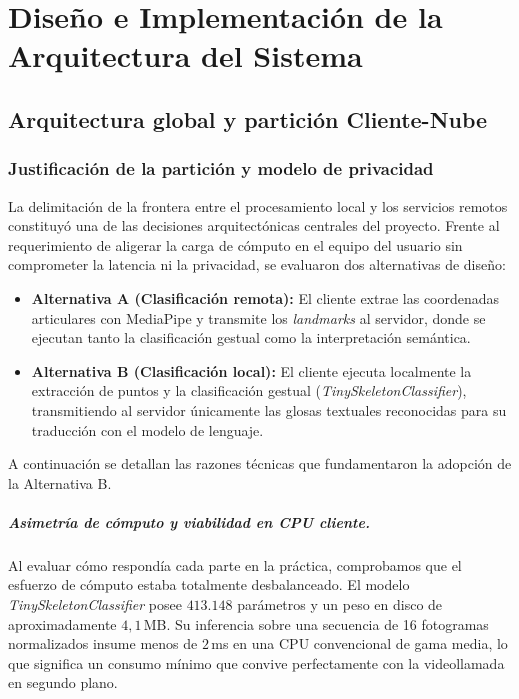 \chapter{Diseño e Implementación de la Arquitectura del Sistema}

\section{Arquitectura global y partición Cliente-Nube}
\subsection{Justificación de la partición y modelo de privacidad}

La delimitación de la frontera entre el procesamiento local y los servicios remotos constituyó una de las decisiones arquitectónicas centrales del proyecto. Frente al requerimiento de aligerar la carga de cómputo en el equipo del usuario sin comprometer la latencia ni la privacidad, se evaluaron dos alternativas de diseño:
\begin{itemize}
    \item \textbf{Alternativa A (Clasificación remota):} El cliente extrae las coordenadas articulares con MediaPipe y transmite los \textit{landmarks} al servidor, donde se ejecutan tanto la clasificación gestual como la interpretación semántica.
    \item \textbf{Alternativa B (Clasificación local):} El cliente ejecuta localmente la extracción de puntos y la clasificación gestual (\textit{TinySkeletonClassifier}), transmitiendo al servidor únicamente las glosas textuales reconocidas para su traducción con el modelo de lenguaje.
\end{itemize}

A continuación se detallan las razones técnicas que fundamentaron la adopción de la Alternativa B.

\paragraph{Asimetría de cómputo y viabilidad en CPU cliente.}
Al evaluar cómo respondía cada parte en la práctica, comprobamos que el esfuerzo de cómputo estaba totalmente desbalanceado. El modelo \textit{TinySkeletonClassifier} posee $413.148$ parámetros y un peso en disco de aproximadamente $4{,}1$\,MB. Su inferencia sobre una secuencia de 16 fotogramas normalizados insume menos de $2$\,ms en una CPU convencional de gama media, lo que significa un consumo mínimo que convive perfectamente con la videollamada en segundo plano.

